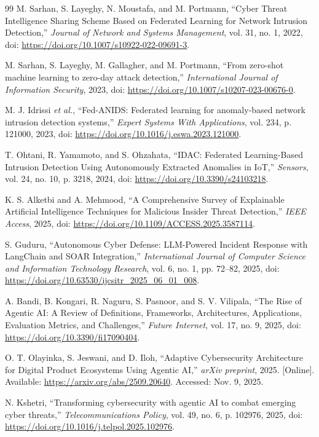 \documentclass[conference]{IEEEtran}
\begin{document}
\begin{thebibliography}{99}
M. Sarhan, S. Layeghy, N. Moustafa, and M. Portmann, ``Cyber Threat Intelligence Sharing Scheme Based on Federated Learning for Network Intrusion Detection,'' \emph{Journal of Network and Systems Management}, vol. 31, no. 1, 2022, doi: \url{https://doi.org/10.1007/s10922-022-09691-3}.

M. Sarhan, S. Layeghy, M. Gallagher, and M. Portmann, ``From zero-shot machine learning to zero-day attack detection,'' \emph{International Journal of Information Security}, 2023, doi: \url{https://doi.org/10.1007/s10207-023-00676-0}.

M. J. Idrissi \emph{et al.}, ``Fed-ANIDS: Federated learning for anomaly-based network intrusion detection systems,'' \emph{Expert Systems With Applications}, vol. 234, p. 121000, 2023, doi: \url{https://doi.org/10.1016/j.eswa.2023.121000}.

T. Ohtani, R. Yamamoto, and S. Ohzahata, ``IDAC: Federated Learning-Based Intrusion Detection Using Autonomously Extracted Anomalies in IoT,'' \emph{Sensors}, vol. 24, no. 10, p. 3218, 2024, doi: \url{https://doi.org/10.3390/s24103218}.

K. S. Alketbi and A. Mehmood, ``A Comprehensive Survey of Explainable Artificial Intelligence Techniques for Malicious Insider Threat Detection,'' \emph{IEEE Access}, 2025, doi: \url{https://doi.org/10.1109/ACCESS.2025.3587114}.

S. Guduru, ``Autonomous Cyber Defense: LLM-Powered Incident Response with LangChain and SOAR Integration,'' \emph{International Journal of Computer Science and Information Technology Research}, vol. 6, no. 1, pp. 72--82, 2025, doi: \url{https://doi.org/10.63530/ijcsitr_2025_06_01_008}.

A. Bandi, B. Kongari, R. Naguru, S. Pasnoor, and S. V. Vilipala, ``The Rise of Agentic AI: A Review of Definitions, Frameworks, Architectures, Applications, Evaluation Metrics, and Challenges,'' \emph{Future Internet}, vol. 17, no. 9, 2025, doi: \url{https://doi.org/10.3390/fi17090404}.

O. T. Olayinka, S. Jeswani, and D. Iloh, ``Adaptive Cybersecurity Architecture for Digital Product Ecosystems Using Agentic AI,'' \emph{arXiv preprint}, 2025. [Online]. Available: \url{https://arxiv.org/abs/2509.20640}. Accessed: Nov. 9, 2025.

N. Kshetri, ``Transforming cybersecurity with agentic AI to combat emerging cyber threats,'' \emph{Telecommunications Policy}, vol. 49, no. 6, p. 102976, 2025, doi: \url{https://doi.org/10.1016/j.telpol.2025.102976}.


\end{thebibliography}
\end{document}
